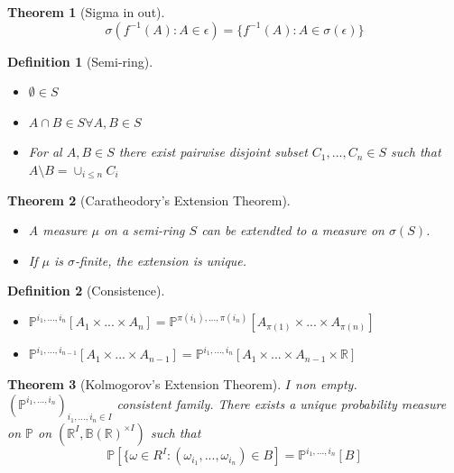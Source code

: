 \documentclass{article}
\newtheorem{theorem}{Theorem}
\newtheorem{definition}{Definition}
\begin{document}
\begin{theorem}[Sigma in out]
  $$\sigma(f^{-1}(A): A \in \epsilon) = \{ f^{-1}(A): A \in \sigma(\epsilon) \}$$
\end{theorem}
\begin{definition}[Semi-ring]
  \begin{itemize}
  \item $\emptyset \in S$
  \item $A \cap B \in S \forall A, B \in S$
  \item For al $A, B \in S$ there exist pairwise disjoint subset $C_1, ..., C_n \in S$ such that $A \setminus B = \cup_{i \le n} C_i$
  \end{itemize}
\end{definition}
\begin{theorem}[Caratheodory's Extension Theorem]
  \begin{itemize}
  \item A measure $\mu$ on a semi-ring $S$ can be extendted to a
    measure on $\sigma(S)$.
  \item If $\mu$ is $\sigma$-finite, the extension is unique.
  \end{itemize}
\end{theorem}
\begin{definition}[Consistence]
  \begin{itemize}
  \item $\mathbb P^{i_1, ..., i_n}[A_1 \times ... \times A_n] = \mathbb P^{\pi(i_1), ... , \pi(i_n)}[A_{\pi(1)} \times ... \times A_{\pi(n)}]$
  \item $\mathbb P^{i_1, ..., i_{n-1}}[A_1 \times ... \times A_{n-1}] = \mathbb P^{i_1, ..., i_n}[A_1 \times ... \times A_{n-1} \times \mathbb R] $
  \end{itemize}
\end{definition}
\begin{theorem}[Kolmogorov's Extension Theorem]
  $I$ non empty.
  $(\mathbb P^{i_1, ..., i_n})_{i_1, ..., i_n \in I}$ consistent family. There exists a unique probability measure on $\mathbb P$ on $(\mathbb R^I, \mathbb B(\mathbb R)^{\times I})$ such that
  $$\mathbb P[\{ \omega \in R^I: (\omega_{i_1}, ..., \omega_{i_n}) \in B] = \mathbb P^{i_1, ..., i_n}[B]$$
\end{theorem}
\end{document}
